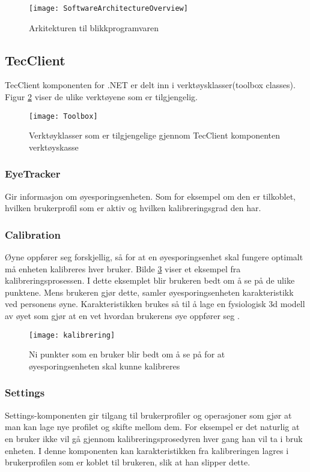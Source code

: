 \begin{figure}[ht!]
\centering
\texttt{[image: SoftwareArchitectureOverview]}
\caption{Arkitekturen til blikkprogramvaren}
\label{fig:overview}
\end{figure}


\subsection{TecClient}

TecClient komponenten for .NET er delt inn i verktøysklasser(toolbox classes). Figur \ref{fig:toolbox} viser de ulike verktøyene som er tilgjengelig.

\begin{figure}[ht!]
\centering
\texttt{[image: Toolbox]}
\caption{Verktøyklasser som er tilgjengelige gjennom TecClient komponenten verktøyskasse}
\label{fig:toolbox}
\end{figure}


\subsubsection{EyeTracker} Gir informasjon om øyesporingsenheten. Som for eksempel om den er tilkoblet, hvilken brukerprofil som er aktiv og hvilken kalibreringsgrad den har.

\subsubsection{Calibration} 
Øyne oppfører seg forskjellig, så for at en øyesporingsenhet skal fungere optimalt må enheten kalibreres hver bruker.  Bilde \ref{fig:kalibre} viser et eksempel fra kalibreringsprosessen. I dette eksemplet blir brukeren bedt om å se på de ulike punktene. Mens brukeren gjør dette, samler øyesporingsenheten karakteristikk ved personens øyne. Karakteristikken brukes så til å lage en fysiologisk 3d modell av øyet som gjør at en vet hvordan brukerens øye oppfører seg \cite{www.t5:online}. 

\begin{figure}[ht!]
\centering
\texttt{[image: kalibrering]}
\caption{Ni punkter som en bruker blir bedt om å se på for at øyesporingsenheten skal kunne kalibreres \cite{VHye88:online}}
\label{fig:kalibre}
\end{figure}


\subsubsection{Settings}
Settings-komponenten gir tilgang til brukerprofiler og operasjoner som gjør at man kan lage nye profilet og skifte mellom dem. For eksempel er det naturlig at en bruker ikke vil gå gjennom kalibreringsprosedyren hver gang han vil ta i bruk enheten. I denne komponenten kan karakteristikken fra kalibreringen lagres i brukerprofilen som er koblet til brukeren, slik at han slipper dette. 


